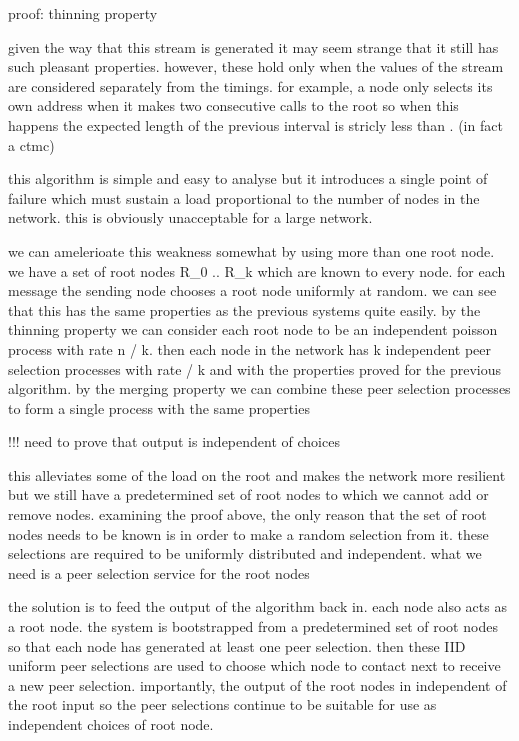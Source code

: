 \documentclass[a4paper,10pt]{article}
\begin{document}
proof: thinning property

given the way that this stream is generated it may seem strange that it still has such pleasant properties. however, these hold only when the values of the stream are considered separately from the timings. for example, a node only selects its own address when it makes two consecutive calls to the root so when this happens the expected length of the previous interval is stricly less than \lambda. (in fact a ctmc)

this algorithm is simple and easy to analyse but it introduces a single point of failure which must sustain a load proportional to the number of nodes in the network. this is obviously unacceptable for a large network. 

we can amelerioate this weakness somewhat by using more than one root node. we have a set of root nodes R_0 .. R_k which are known to every node. for each message the sending node chooses a root node uniformly at random. we can see that this has the same properties as the previous systems quite easily. by the thinning property we can consider each root node to be an independent poisson process with rate n \lambda / k. then each node in the network has k independent peer selection processes with rate \lambda / k and with the properties proved for the previous algorithm. by the merging property we can combine these peer selection processes to form a single process with the same properties

!!! need to prove that output is independent of choices

this alleviates some of the load on the root and makes the network more resilient but we still have a predetermined set of root nodes to which we cannot add or remove nodes. examining the proof above, the only reason that the set of root nodes needs to be known is in order to make a random selection from it. these selections are required to be uniformly distributed and independent. what we need is a peer selection service for the root nodes

the solution is to feed the output of the algorithm back in. each node also acts as a root node. the system is bootstrapped from a predetermined set of root nodes so that each node has generated at least one peer selection. then these IID uniform peer selections are used to choose which node to contact next to receive a new peer selection. importantly, the output of the root nodes in independent of the root input so the peer selections continue to be suitable for use as independent choices of root node.
\end{document}
